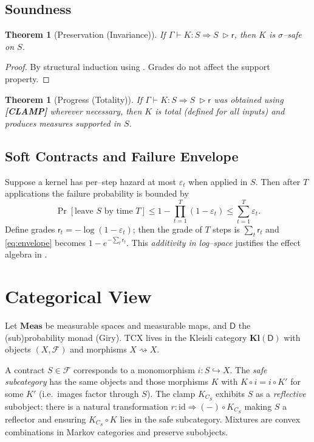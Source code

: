 \documentclass[11pt]{article}
\theoremstyle{definition}
\theoremstyle{plain}
\newtheorem{theorem}[definition]{Theorem}
\theoremstyle{remark}
\newcommand{\X}{X}
\newcommand{\F}{\mathcal{F}}
\newcommand{\D}{\mathsf{D}} %
\newcommand{\1}{\mathbf{1}}
\newcommand{\iden}{\mathrm{id}}
\newcommand{\clamp}{C}
\newcommand{\grade}{\mathsf{r}}
\begin{document}
\subsection{Soundness}
\begin{theorem}[Preservation (Invariance)]\label{thm:soundness}
If $\Gamma\vdash K:S\Rightarrow S\ \triangleright \grade$, then $K$ is $\sigma$--safe on $S$.
\end{theorem}
\begin{proof}
By structural induction using . Grades do not affect the support property.
\end{proof}

\begin{theorem}[Progress (Totality)]\label{thm:progress}
If $\Gamma\vdash K:S\Rightarrow S\ \triangleright \grade$ was obtained using \textbf{[CLAMP]} wherever necessary, then $K$ is total (defined for all inputs) and produces measures supported in $S$.
\end{theorem}

\subsection{Soft Contracts and Failure Envelope}
Suppose a kernel has per--step hazard at most $\varepsilon_t$ when applied in $S$. Then after $T$ applications the failure probability is bounded by
\begin{equation}\label{eq:envelope}
\Pr[\text{leave $S$ by time $T$}] \le 1- \prod_{t=1}^T (1-\varepsilon_t) \le \sum_{t=1}^T \varepsilon_t.
\end{equation}
Define grades $\grade_t=-\log(1-\varepsilon_t)$; then the grade of $T$ steps is $\sum_t \grade_t$ and \eqref{eq:envelope} becomes $1-e^{-\sum_t \grade_t}$. This \emph{additivity in log--space} justifies the effect algebra in .

\section{Categorical View}
Let $\mathbf{Meas}$ be measurable spaces and measurable maps, and $\D$ the (sub)probability monad (Giry). TCX lives in the Kleisli category $\mathbf{Kl}(\D)$ with objects $(\X,\F)$ and morphisms $\X\rightsquigarrow \X$.

A contract $S\in\F$ corresponds to a monomorphism $i:S\hookrightarrow \X$. The \emph{safe subcategory} has the same objects and those morphisms $K$ with $K\circ i = i \circ K'$ for some $K'$ (i.e.\ images factor through $S$). The clamp $K_{\clamp_S}$ exhibits $S$ as a \emph{reflective} subobject: there is a natural transformation $r:\iden\Rightarrow (-)\circ K_{\clamp_S}$ making $S$ a reflector and ensuring $K_{\clamp_S}\circ K$ lies in the safe subcategory. Mixtures are convex combinations in Markov categories and preserve subobjects.
\end{document}
